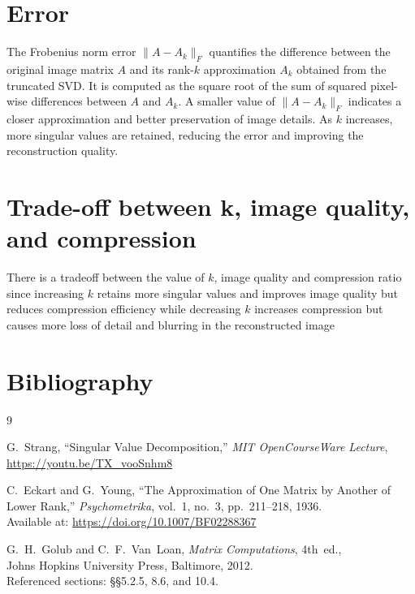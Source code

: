 \documentclass[13pt]{article}
\begin{document}
\section{Error}
The Frobenius norm error $\|A - A_k\|_F$ quantifies the difference between the original image matrix $A$ and its rank-$k$ approximation $A_k$ obtained from the truncated SVD. 
It is computed as the square root of the sum of squared pixel-wise differences between $A$ and $A_k$. 
A smaller value of $\|A - A_k\|_F$ indicates a closer approximation and better preservation of image details. 
As $k$ increases, more singular values are retained, reducing the error and improving the reconstruction quality.



\section{Trade-off between k, image quality, and compression}
There is a tradeoff between the value of $k$, image quality and compression ratio since increasing $k$ retains more singular values and improves image quality but reduces compression efficiency while decreasing $k$ increases compression but causes more loss of detail and blurring in the reconstructed image
\section{Bibliography}
\begin{thebibliography}{9}

G.~Strang, ``Singular Value Decomposition,'' \textit{MIT OpenCourseWare Lecture},\\
\url{https://youtu.be/TX_vooSnhm8}

C.~Eckart and G.~Young, ``The Approximation of One Matrix by Another of Lower Rank,'' 
\textit{Psychometrika}, vol.~1, no.~3, pp.~211--218, 1936.\\
Available at: \url{https://doi.org/10.1007/BF02288367}

G.~H.~Golub and C.~F.~Van~Loan, \textit{Matrix Computations}, 4th~ed.,\\
Johns Hopkins University Press, Baltimore, 2012.\\
Referenced sections: §§5.2.5, 8.6, and 10.4.

\end{thebibliography}
\end{document}
